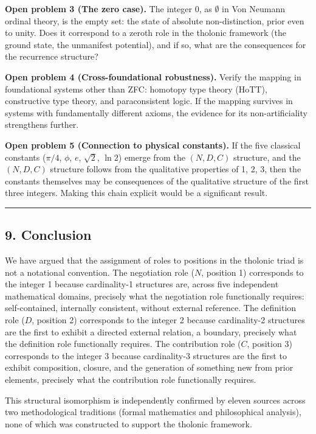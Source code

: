 \documentclass[
  11pt,
  letterpaper,
]{article}
\begin{document}
\textbf{Open problem 3 (The zero case).} The integer 0, as \(\emptyset\)
in Von Neumann ordinal theory, is the empty set: the state of absolute
non-distinction, prior even to unity. Does it correspond to a zeroth
role in the tholonic framework (the ground state, the unmanifest
potential), and if so, what are the consequences for the recurrence
structure?

\textbf{Open problem 4 (Cross-foundational robustness).} Verify the
mapping in foundational systems other than ZFC: homotopy type theory
(HoTT), constructive type theory, and paraconsistent logic. If the
mapping survives in systems with fundamentally different axioms, the
evidence for its non-artificiality strengthens further.

\textbf{Open problem 5 (Connection to physical constants).} If the five
classical constants (\(\pi/4\), \(\phi\), \(e\), \(\sqrt{2}\),
\(\ln 2\)) emerge from the \((N, D, C)\) structure, and the
\((N, D, C)\) structure follows from the qualitative properties of 1, 2,
3, then the constants themselves may be consequences of the qualitative
structure of the first three integers. Making this chain explicit would
be a significant result.

\begin{center}\rule{0.5\linewidth}{0.5pt}\end{center}

\subsection{9. Conclusion}\label{conclusion}

We have argued that the assignment of roles to positions in the tholonic
triad is not a notational convention. The negotiation role (\(N\),
position 1) corresponds to the integer 1 because cardinality-1
structures are, across five independent mathematical domains, precisely
what the negotiation role functionally requires: self-contained,
internally consistent, without external reference. The definition role
(\(D\), position 2) corresponds to the integer 2 because cardinality-2
structures are the first to exhibit a directed external relation, a
boundary, precisely what the definition role functionally requires. The
contribution role (\(C\), position 3) corresponds to the integer 3
because cardinality-3 structures are the first to exhibit composition,
closure, and the generation of something new from prior elements,
precisely what the contribution role functionally requires.

This structural isomorphism is independently confirmed by eleven sources
across two methodological traditions (formal mathematics and
philosophical analysis), none of which was constructed to support the
tholonic framework.
\end{document}
